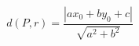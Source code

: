 \documentclass[12pt]{article}
\begin{document}
\[
    d(P, r) = \frac{|ax_0 + by_0 + c|}{\sqrt{a^2 + b^2}}
\]
\end{document}
